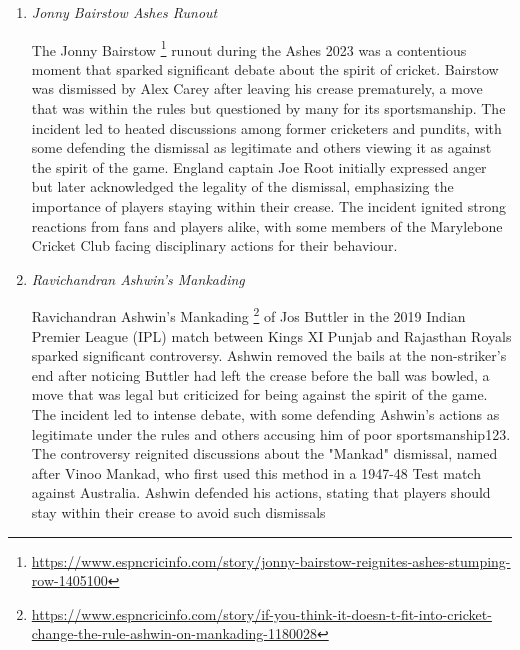 \documentclass{article}
\begin{document}
\begin{enumerate}
Luis Suárez's deliberate handball \footnote{\url{https://www.skysports.com/football/news/12040/12759389/uruguays-luis-suarez-says-he-will-not-apologise-to-ghana-for-his-handball-that-knocked-them-out-of-2010-world-cup}} in the 2010 World Cup quarter-final against Ghana was a pivotal moment of controversy. Suárez used his hands to block Dominic Adiyiah's goal-bound shot, earning a red card and a penalty for Ghana. However, Asamoah Gyan missed the penalty, and Uruguay won the match in a penalty shootout, denying Ghana a historic semi-final spot. The incident sparked widespread outrage in Ghana, with many viewing Suárez's actions as unsportsmanlike. Suárez has consistently refused to apologize for the handball, stating that he would only apologize if he had injured a player, not for a tactical decision that led to a penalty. The event remains a significant point of contention between Uruguay and Ghana, with Suárez often being seen as a villain in Ghanaian eyes.



\item \textit{Jonny Bairstow Ashes Runout}

The Jonny Bairstow \footnote{\url{https://www.espncricinfo.com/story/jonny-bairstow-reignites-ashes-stumping-row-1405100}} runout during the Ashes 2023 was a contentious moment that sparked significant debate about the spirit of cricket. Bairstow was dismissed by Alex Carey after leaving his crease prematurely, a move that was within the rules but questioned by many for its sportsmanship. The incident led to heated discussions among former cricketers and pundits, with some defending the dismissal as legitimate and others viewing it as against the spirit of the game. England captain Joe Root initially expressed anger but later acknowledged the legality of the dismissal, emphasizing the importance of players staying within their crease. The incident ignited strong reactions from fans and players alike, with some members of the Marylebone Cricket Club facing disciplinary actions for their behaviour.


\item \textit{Ravichandran Ashwin's Mankading}

Ravichandran Ashwin's Mankading \footnote{\url{https://www.espncricinfo.com/story/if-you-think-it-doesn-t-fit-into-cricket-change-the-rule-ashwin-on-mankading-1180028}} of Jos Buttler in the 2019 Indian Premier League (IPL) match between Kings XI Punjab and Rajasthan Royals sparked significant controversy. Ashwin removed the bails at the non-striker's end after noticing Buttler had left the crease before the ball was bowled, a move that was legal but criticized for being against the spirit of the game. The incident led to intense debate, with some defending Ashwin's actions as legitimate under the rules and others accusing him of poor sportsmanship123. The controversy reignited discussions about the "Mankad" dismissal, named after Vinoo Mankad, who first used this method in a 1947-48 Test match against Australia. Ashwin defended his actions, stating that players should stay within their crease to avoid such dismissals



\end{enumerate}
\end{document}
